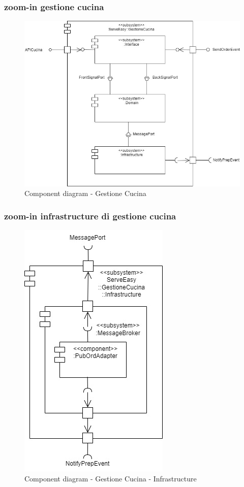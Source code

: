 \subsubsection{zoom-in gestione cucina}
\begin{figure}[H]
	\centering
	\includegraphics[scale=0.5]{iterazione1/images/component_comanda_cucina-GestioneCucina.jpg}
	\caption{Component diagram - Gestione Cucina \label{fig:component_diagram_gestione_cucina}}
\end{figure}

\subsubsection{zoom-in infrastructure di gestione cucina}
\begin{figure}[H]
	\centering
	\includegraphics[scale=0.5]{iterazione1/images/component_comanda_cucina-GestioneCucina__Infrastructure.jpg}
	\caption{Component diagram - Gestione Cucina - Infrastructure \label{fig:component_diagram_gestione_cucina_infrastructure}}
\end{figure}

